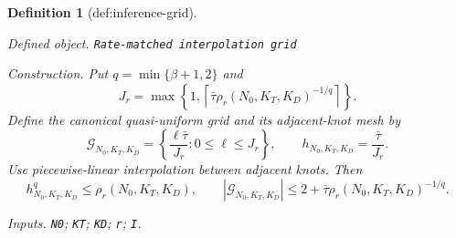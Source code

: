 \documentclass{article}
\newtheorem{definition}{Definition}
\begin{document}
\begin{definition}[def:inference-grid]\label{def:inference-grid}
\par\smallskip\noindent\emph{Defined object.} \texttt{Rate-\allowbreak{}matched interpolation grid}
\par\smallskip\noindent\emph{Construction.} Put \(q=\min\{\beta+1,2\}\) and
\[
 J_r=\max\left\{1,
 \left\lceil\bar\tau\rho_r(N_0,K_T,K_D)^{-1/q}\right\rceil
 \right\}.
\]
Define the canonical quasi-uniform grid and its adjacent-knot mesh by
\[
 \mathcal G_{N_0,K_T,K_D}
 =\left\{\frac{\ell\bar\tau}{J_r}:0\le\ell\le J_r\right\},
 \qquad h_{N_0,K_T,K_D}=\frac{\bar\tau}{J_r}.
\]
Use piecewise-linear interpolation between adjacent knots. Then
\[
 h_{N_0,K_T,K_D}^{q}\le\rho_r(N_0,K_T,K_D),
 \qquad
 |\mathcal G_{N_0,K_T,K_D}|
 \le2+\bar\tau\rho_r(N_0,K_T,K_D)^{-1/q}.
\]
\par\smallskip\noindent\emph{Inputs.} \texttt{N0}; \texttt{KT}; \texttt{KD}; \texttt{r}; \texttt{I}.
\end{definition}
\end{document}
